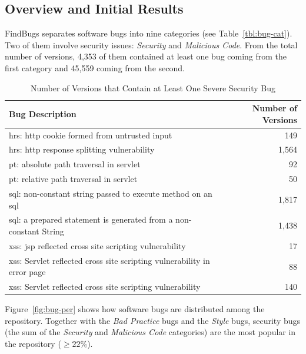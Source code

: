 \documentclass[conference]{llncs}
\begin{document}
\subsection{Overview and Initial Results}
\label{sec:overview}

FindBugs separates software bugs into nine categories (see
Table~\ref{tbl:bug-cat}). Two of them involve security issues: {\it Security} and {\it
Malicious Code}. From the total number of versions, 4,353 of them contained
at least one bug coming from the first category
and 45,559 coming from the second.

\begin{table}
\centering
\caption{Number of Versions that Contain at Least One Severe Security Bug}
\label{tbl:sev}
\leavevmode
	\begin{tabular}{l r}
	\hline
	Bug Description & Number of Versions\\
 	\hline
	{\sc hrs}: {\sc http} cookie formed from untrusted input & 149\\
	{\sc hrs}: {\sc http} response splitting vulnerability & 1,564\\
	{\sc pt}: absolute path traversal in servlet  & 92\\
	{\sc pt}: relative path traversal in servlet & 50\\
	{\sc sql}: non-constant string passed to execute method on an {\sc sql} & 1,817\\
	{\sc sql}: a prepared statement is generated from a non-constant String & 1,438\\
	{\sc xss}: {\sc jsp} reflected cross site scripting vulnerability & 17\\
	{\sc xss}: Servlet reflected cross site scripting vulnerability in error page & 88\\
	{\sc xss}: Servlet reflected cross site scripting vulnerability & 140\\
	\hline
	\end{tabular}
\end{table}

Figure~\ref{fig:bug-per} shows how software bugs are distributed among the
repository. Together with the {\it Bad Practice} bugs and the {\it Style} bugs,
security bugs (the sum of the {\it Security} and {\it Malicious Code}
categories) are the most popular in the repository ($\geq 22\%$).
\end{document}
